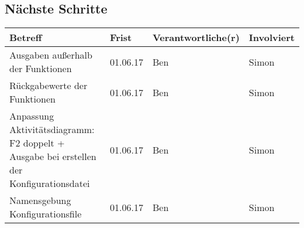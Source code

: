 \documentclass{scrartcl}
\begin{document}
\subsection{Nächste Schritte}
\begin{tabular}{L{.249} L{.2} L{.25} L{.25}}
Betreff & Frist & Verantwortliche(r) & Involviert\\\hline
Ausgaben außerhalb der Funktionen & 01.06.17 & Ben & Simon\\\hline
Rückgabewerte der Funktionen & 01.06.17 & Ben & Simon\\\hline
Anpassung Aktivitätsdiagramm: F2 doppelt + Ausgabe bei erstellen der Konfigurationsdatei & 01.06.17 & Ben & Simon\\\hline
Namensgebung Konfigurationsfile & 01.06.17 & Ben & Simon\\\hline
\end{tabular}
\end{document}
